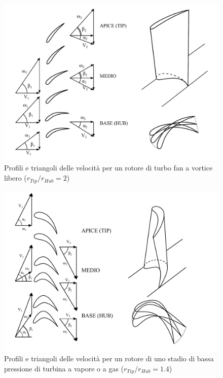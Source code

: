\begin{figure}
\centering
  \includegraphics[width=.8\textwidth]{fig/TurboFan.pdf}
\caption{Profili e triangoli delle velocità per un rotore di turbo fan a vortice libero ($r_{Tip}/r_{Hub} =2$)}
\label{fig:TurboFan1}
\end{figure}
\begin{figure}
\centering
  \includegraphics[width=.8\textwidth]{fig/TurbVortLib.pdf}
\caption{Profili e triangoli delle velocità per un rotore di uno stadio di bassa pressione di turbina a vapore o a gas ($r_{Tip}/r_{Hub} =1.4$)}
\label{fig:TurbVortLib}
\end{figure}
